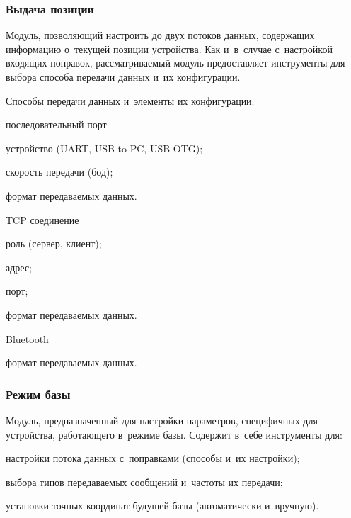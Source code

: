 \subsubsection{Выдача позиции}

Модуль, позволяющий настроить до двух потоков данных, содержащих информацию о~текущей позиции устройства. Как и~в~случае с~настройкой входящих поправок, рассматриваемый модуль предоставляет инструменты для выбора способа передачи данных и~их конфигурации.

Способы передачи данных и~элементы их конфигурации:
\begin{dashitemize}
  \item последовательный порт
  \begin{dashitemize}
    \item устройство (UART, USB-to-PC, USB-OTG);
    \item скорость передачи (бод);
    \item формат передаваемых данных.
  \end{dashitemize}

  \item TCP соединение
  \begin{dashitemize}
    \item роль (сервер, клиент);
    \item адрес;
    \item порт;
    \item формат передаваемых данных.
  \end{dashitemize}

  \item Bluetooth
  \begin{dashitemize}
    \item формат передаваемых данных.
  \end{dashitemize}
\end{dashitemize}

\subsubsection{Режим базы}

Модуль, предназначенный для настройки параметров, специфичных для устройства, работающего в~режиме базы. Содержит в~себе инструменты для:
\begin{dashitemize}
  \item настройки потока данных с~поправками (способы и~их настройки);
  \item выбора типов передаваемых сообщений и~частоты их передачи;
  \item установки точных координат будущей базы (автоматически и~вручную).
\end{dashitemize}

